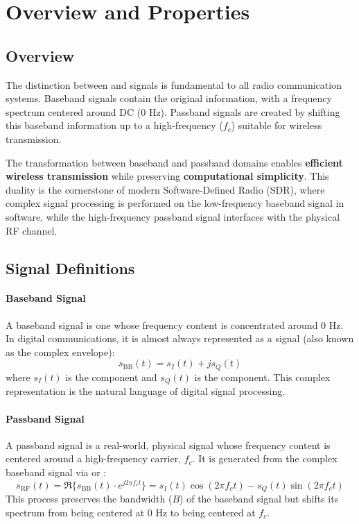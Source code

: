 \section{Overview and Properties}

\subsection{Overview}

The distinction between  and  signals is fundamental to all radio communication systems. Baseband signals contain the original information, with a frequency spectrum centered around DC (0 Hz). Passband signals are created by shifting this baseband information up to a high-frequency  ($f_c$) suitable for wireless transmission.

\begin{keyconcept}
    The transformation between baseband and passband domains enables \textbf{efficient wireless transmission} while preserving \textbf{computational simplicity}. This duality is the cornerstone of modern Software-Defined Radio (SDR), where complex signal processing is performed on the low-frequency baseband signal in software, while the high-frequency passband signal interfaces with the physical RF channel.
\end{keyconcept}


\subsection{Signal Definitions}

\paragraph{Baseband Signal}
A baseband signal is one whose frequency content is concentrated around 0 Hz. In digital communications, it is almost always represented as a  signal (also known as the complex envelope):
\begin{equation}
    s_{\text{BB}}(t) = s_I(t) + js_Q(t)
\end{equation}
where $s_I(t)$ is the  component and $s_Q(t)$ is the  component. This complex representation is the natural language of digital signal processing.

\paragraph{Passband Signal}
A passband signal is a real-world, physical signal whose frequency content is centered around a high-frequency carrier, $f_c$. It is generated from the complex baseband signal via  or :
\begin{equation}
    s_{\text{RF}}(t) = \Re\{s_{\text{BB}}(t) \cdot e^{j2\pi f_c t}\} = s_I(t)\cos(2\pi f_c t) - s_Q(t)\sin(2\pi f_c t)
\end{equation}
This process preserves the bandwidth ($B$) of the baseband signal but shifts its spectrum from being centered at 0 Hz to being centered at $f_c$.


